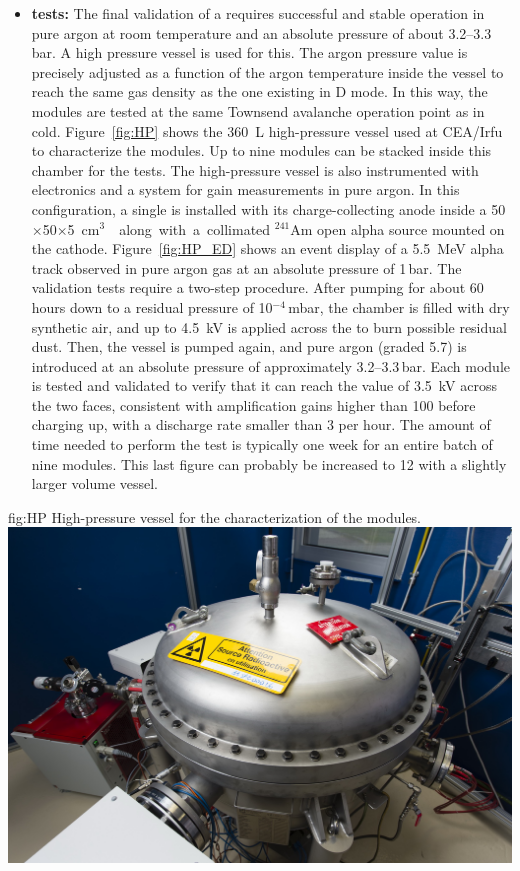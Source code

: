 \begin{itemize}
\item {\bf {} tests:} The final validation of a  requires successful and stable operation in pure argon at room temperature and an absolute pressure of about \numrange{3.2}{3.3}\,bar. A high pressure vessel is used for this.  The argon pressure value is precisely adjusted as a function of the argon temperature inside the vessel to reach the same gas density as the one existing in D mode. In this way, the  modules are tested at the same Townsend avalanche operation point as in cold. Figure~\ref{fig:HP} shows the \SI{360}{L} high-pressure vessel used at CEA/Irfu to characterize the    modules. Up to nine  modules can be stacked inside this chamber for the  tests. The high-pressure vessel is also instrumented with  electronics and a  system for gain measurements in pure argon. In this configuration, a single  is installed with its \twod charge-collecting anode inside 
a \num{50}$\times$\num{50}$\times$\SI{5}{cm$^3$} 
 along with a collimated $^{241}$Am open alpha source mounted on 
the cathode. Figure~\ref{fig:HP_ED} shows an event display of a \SI{5.5}{MeV} alpha track observed in pure argon gas at an 
absolute pressure of \num{1}\,bar.
%
The  validation  tests require a two-step procedure. After pumping for 
about \num{60} hours down to a residual pressure of \num{10}$^{-4}$\,mbar, the chamber is filled with dry synthetic air, and 
  up to \SI{4.5}{kV} is applied across the  to 
burn possible residual dust. Then, the vessel is pumped again, and pure argon (graded \num{5.7})
is introduced at an absolute pressure of approximately \numrange{3.2}{3.3}\,bar. Each  module is tested 
and validated to verify that it can reach the value of \SI{3.5}{kV} across the two faces, consistent with amplification gains higher than \num{100} before charging up, with a discharge rate smaller than 3 per hour. The amount of time needed to perform the   test is 
typically one week for an entire batch of nine  modules. This last figure can probably be increased to \num{12} with a slightly larger volume vessel. 
\end{itemize}

\begin{dunefigure}
{fig:HP} 
{High-pressure vessel for the characterization of the    modules.}
  \includegraphics[width=.7\textwidth]{graphics/HP}
\end{dunefigure}

